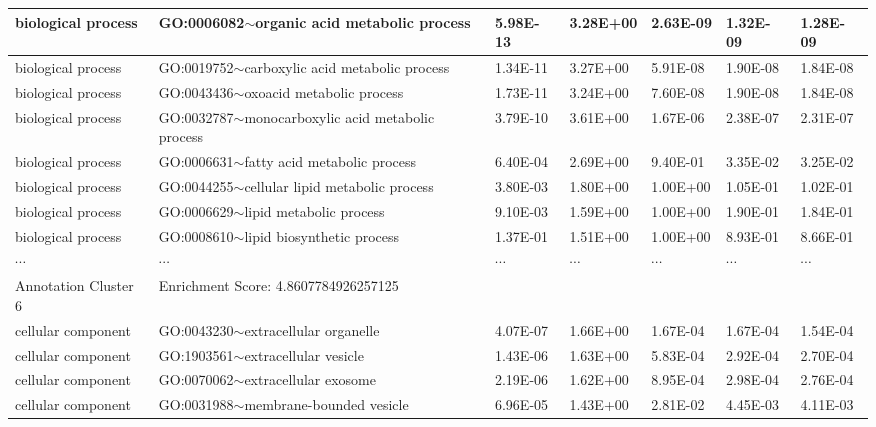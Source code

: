 \documentclass{article}
\begin{document}
\begin{landscape}
\begin{table}
{\begin{tabular}{|l|l|l|l|l|l|l|}
biological process   & GO:0006082$\sim$organic acid metabolic process                     & 5.98E-13 & 3.28E+00        & 2.63E-09   & 1.32E-09  & 1.28E-09 \\ \hline
biological process   & GO:0019752$\sim$carboxylic acid metabolic process                  & 1.34E-11 & 3.27E+00        & 5.91E-08   & 1.90E-08  & 1.84E-08 \\ \hline
biological process   & GO:0043436$\sim$oxoacid metabolic process                          & 1.73E-11 & 3.24E+00        & 7.60E-08   & 1.90E-08  & 1.84E-08 \\ \hline
biological process   & GO:0032787$\sim$monocarboxylic acid metabolic process              & 3.79E-10 & 3.61E+00        & 1.67E-06   & 2.38E-07  & 2.31E-07 \\ \hline
biological process   & GO:0006631$\sim$fatty acid metabolic process                       & 6.40E-04 & 2.69E+00        & 9.40E-01   & 3.35E-02  & 3.25E-02 \\ \hline
biological process   & GO:0044255$\sim$cellular lipid metabolic process                   & 3.80E-03 & 1.80E+00        & 1.00E+00   & 1.05E-01  & 1.02E-01 \\ \hline
biological process   & GO:0006629$\sim$lipid metabolic process                            & 9.10E-03 & 1.59E+00        & 1.00E+00   & 1.90E-01  & 1.84E-01 \\ \hline
biological process   & GO:0008610$\sim$lipid biosynthetic process                         & 1.37E-01 & 1.51E+00        & 1.00E+00   & 8.93E-01  & 8.66E-01 \\ \hline\hline
$\cdots$ & $\cdots$ & $\cdots$ & $\cdots$ & $\cdots$ & $\cdots$ & $\cdots$ \\ \hline\hline
Annotation Cluster 6 & Enrichment Score: 4.8607784926257125                               &          &                 &            &           &          \\ \hline
cellular component   & GO:0043230$\sim$extracellular organelle                            & 4.07E-07 & 1.66E+00        & 1.67E-04   & 1.67E-04  & 1.54E-04 \\ \hline
cellular component   & GO:1903561$\sim$extracellular vesicle                              & 1.43E-06 & 1.63E+00        & 5.83E-04   & 2.92E-04  & 2.70E-04 \\ \hline
cellular component   & GO:0070062$\sim$extracellular exosome                              & 2.19E-06 & 1.62E+00        & 8.95E-04   & 2.98E-04  & 2.76E-04 \\ \hline
cellular component   & GO:0031988$\sim$membrane-bounded vesicle                           & 6.96E-05 & 1.43E+00        & 2.81E-02   & 4.45E-03  & 4.11E-03 \\ \hline

\end{tabular}}
\end{table}
\end{landscape}
\end{document}

